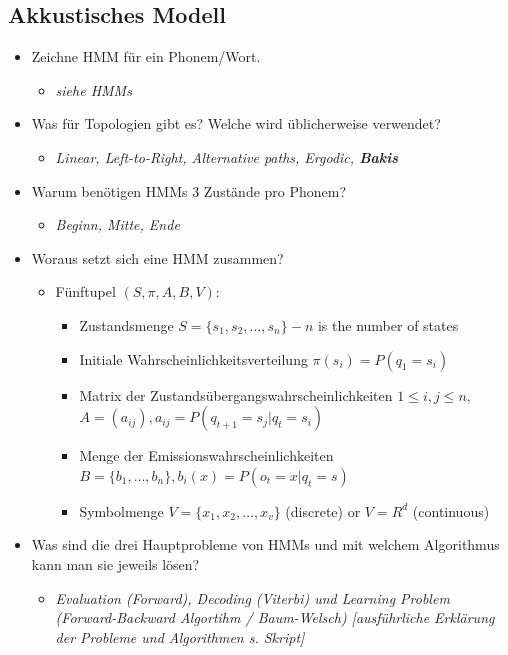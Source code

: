 \subsection{Akkustisches Modell}
\begin{itemize}
\item Zeichne HMM für ein Phonem/Wort.
\begin{itemize}
\item \emph{siehe HMMs}
\end{itemize}
\item Was für Topologien gibt es? Welche wird üblicherweise verwendet?
\begin{itemize}
\item \emph{Linear, Left-to-Right, Alternative paths, Ergodic, \textbf{Bakis}}
\end{itemize}
\item Warum benötigen HMMs 3 Zustände pro Phonem?
\begin{itemize}
\item \emph{Beginn, Mitte, Ende}
\end{itemize}
\item Woraus setzt sich eine HMM zusammen?
\begin{itemize}
\item Fünftupel $(S, \pi, A, B, V)$:
\begin{itemize}
\item Zustandsmenge $S = \{s_1,s_2,\dots,s_n\} - n$ is the number of states
\item Initiale Wahrscheinlichkeitsverteilung $\pi(s_i) = P(q_1 = s_i)$
\item Matrix der Zustandsübergangswahrscheinlichkeiten $1 \le i, j \le n, $\\ $A = (a_{ij}), a_{ij} = P(q_{t+1} = s_j | q_t = s_i)$
\item Menge der Emissionswahrscheinlichkeiten $B = \{b_1, \dots, b_n\}, b_i(x) = P(o_t = x | q_t = s)$
\item Symbolmenge $V = \{x_1,x_2,\dots,x_v\}$ (discrete) or $V = R^d$ (continuous)
\end{itemize}
\end{itemize}
\item Was sind die drei Hauptprobleme von HMMs und mit welchem Algorithmus kann man sie jeweils lösen?
\begin{itemize}
\item \emph{Evaluation (Forward), Decoding (Viterbi) und Learning Problem (Forward-Backward Algortihm / Baum-Welsch) [ausführliche Erklärung der Probleme und Algorithmen s. Skript]}

\end{itemize}
\end{itemize}
